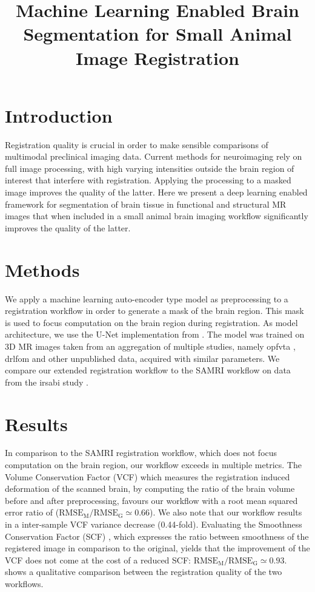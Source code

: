 \documentclass[11pt, english]{article}
\title{Machine Learning Enabled Brain Segmentation for Small Animal Image Registration}
\date{}
\begin{document}
    \maketitle


    \section{Introduction}
    Registration quality is crucial in order to make sensible comparisons of multimodal preclinical imaging data.
    Current methods for neuroimaging rely on full image processing, with high varying intensities outside the brain region of interest that interfere with registration.
    Applying the processing to a masked image improves the quality of the latter.
    Here we present a deep learning enabled framework for segmentation of brain tissue in functional and structural MR images that when included in a small animal brain imaging workflow significantly improves the quality of the latter.


    \section{Methods}
    We apply a machine learning auto-encoder type model as preprocessing to a registration workflow in order to generate a mask of the brain region.
    This mask is used to focus computation on the brain region during registration.
    As model architecture, we use the U-Net \citep{ronneberger_u-net:_2015} implementation from \citet{oktay_ozan-oktayattention-gated-networks_2020}.
    The model was trained on 3D MR images taken from an aggregation of multiple studies, namely opfvta \citep{ioanas_whole-brain_nodate}, drlfom \citep{imperfect_datasets} and other unpublished data, acquired with similar parameters.
    We compare our extended registration workflow to the SAMRI workflow \citep{samri} on data from the irsabi study
    \citep{irsabi_bidsdata}.


    \section{Results}
    In comparison to the SAMRI registration workflow, which does not focus computation on the brain region, our workflow exceeds in multiple metrics.
    The Volume Conservation Factor (VCF) \citep{ioanas_optimized_2019} which measures the registration induced deformation of the scanned brain, by computing the ratio of the brain volume before and after preprocessing, favours our workflow with a root mean squared error ratio of ($\mathrm{RMSE_{M}/RMSE_{G}\simeq} 0.66$).
    We also note that our workflow results in a inter-sample VCF variance decrease (0.44-fold).
    Evaluating the Smoothness Conservation Factor (SCF) \citep{ioanas_optimized_2019}, which expresses the ratio between smoothness of the registered image in comparison to the original, yields that the improvement of the VCF does not come at the cost of a reduced SCF: $\mathrm{RMSE_{M}/RMSE_{G}\simeq} 0.93$.
     shows a qualitative comparison between the registration quality of the two workflows.
\end{document}

